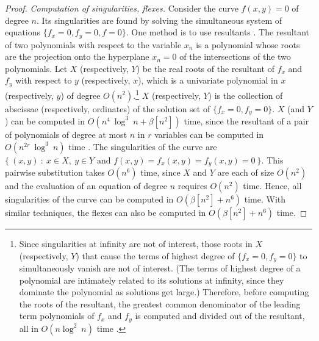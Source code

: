 \begin{proof}
{\em Computation of singularities, flexes.} 
%
Consider the curve $f(x,y) = 0$ of degree $n$.
Its singularities are found by solving the simultaneous system
of equations \mbox{$\{f_{x} = 0, f_{y}=0, f = 0\}$}.
One method is to use resultants \cite{walker}.
The resultant of two polynomials with respect to the variable $x_{n}$ is a polynomial
whose roots are the projection onto the hyperplane $x_{n} = 0$
of the intersections of the two polynomials.
Let $X$ (respectively, $Y$) be the real roots of the resultant of $f_{x}$ and $f_{y}$ 
with respect to $y$ (respectively, $x$), which is a univariate polynomial in $x$ 
(respectively, $y$)
of degree $O(n^{2})$.\footnote{Since 
	singularities at infinity are not of interest, those roots in $X$ (respectively, $Y$)
	that cause the terms of highest degree of \mbox{$\{f_{x} = 0, f_{y}=0\}$} to 
	simultaneously vanish are not of interest.
	(The terms of highest degree of a polynomial are intimately related to its 
	solutions at infinity, since they dominate the polynomial as solutions get large.)
	Therefore, before computing the roots of the resultant, the 
	greatest common denominator of the leading term
	polynomials of $f_{x}$ and $f_{y}$ is computed and divided out of the 
	resultant, all in $O(n\log^{2}\ n)$ time \cite{ahu}.}
$X$ (respectively, $Y$) is the collection of abscissae (respectively, ordinates)
of the solution set of \mbox{$\{f_{x} = 0, f_{y}=0\}$}.
$X$ (and $Y$) can be computed in $O(n^{4}\ \log^{3}\ n + \beta[n^{2}])$ time, since
the resultant of a pair of polynomials of degree at most $n$ in $r$ variables 
can be computed in $O(n^{2r}\ \log^{3}\ n)$ time \cite{bajj}.
The singularities of the curve are
\mbox{$\{\ (x,y)\ :\ x\in X,\ y \in Y \mbox{ and } f(x,y) = f_{x}(x,y) = f_{y}(x,y) = 
0\ \}$.}
This pairwise substitution takes $O(n^{6})$ 
time, since $X$ and $Y$ are each of size $O(n^{2})$ and the evaluation of an equation of 
degree $n$ requires $O(n^{2})$ time.
Hence, all singularities of the curve can be computed in $O(\beta[n^{2}] + n^{6})$
time.
With similar techniques, the flexes can also be computed in $O(\beta[n^{2}] + n^{6})$
time.


\end{proof}
